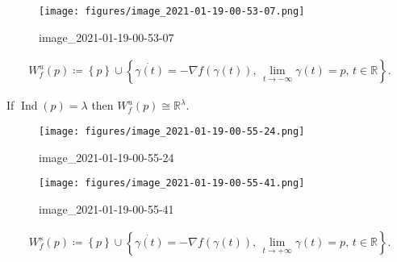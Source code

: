 \begin{example}[?]

\begin{figure}
\centering
\texttt{[image: figures/image\_2021-01-19-00-53-07.png]}
\caption{image\_2021-01-19-00-53-07}
\end{figure}

\end{example}

\begin{definition}

\begin{align*}
W_f^u(p) \coloneqq\left\{{p}\right\} \cup\left\{{
\dot{\gamma(t)} = -\nabla f(\gamma(t)),\, \lim_{t\to -\infty} \gamma(t) = p,\, t\in {\mathbb{R}}
}\right\}
.\end{align*}

\end{definition}

\begin{lemma}[?]

If \(\mathop{\mathrm{Ind}}(p) = \lambda\) then
\(W_f^u(p) \cong {\mathbb{R}}^ \lambda\).

\end{lemma}

\begin{example}[?]

\begin{figure}
\centering
\texttt{[image: figures/image\_2021-01-19-00-55-24.png]}
\caption{image\_2021-01-19-00-55-24}
\end{figure}

\end{example}

\begin{example}[?]

\begin{figure}
\centering
\texttt{[image: figures/image\_2021-01-19-00-55-41.png]}
\caption{image\_2021-01-19-00-55-41}
\end{figure}

\end{example}

\begin{definition}

\begin{align*}
W_f^s(p) \coloneqq\left\{{p}\right\} \cup\left\{{
\dot{\gamma(t)} = -\nabla f(\gamma(t)),\, \lim_{t\to +\infty} \gamma(t) = p,\, t\in {\mathbb{R}}
}\right\}
.\end{align*}

\end{definition}

